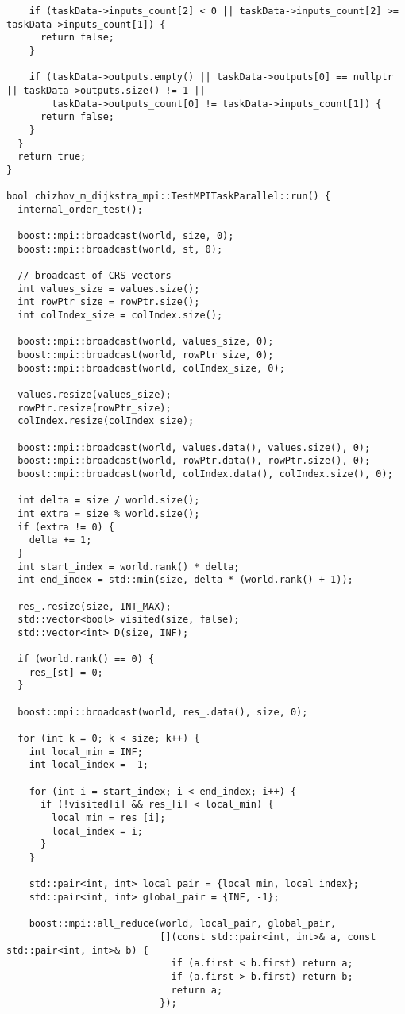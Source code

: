 \documentclass[a4paper, 14pt]{extarticle}
\begin{document}
\begin{lstlisting}
    if (taskData->inputs_count[2] < 0 || taskData->inputs_count[2] >= taskData->inputs_count[1]) {
      return false;
    }

    if (taskData->outputs.empty() || taskData->outputs[0] == nullptr || taskData->outputs.size() != 1 ||
        taskData->outputs_count[0] != taskData->inputs_count[1]) {
      return false;
    }
  }
  return true;
}

bool chizhov_m_dijkstra_mpi::TestMPITaskParallel::run() {
  internal_order_test();

  boost::mpi::broadcast(world, size, 0);
  boost::mpi::broadcast(world, st, 0);

  // broadcast of CRS vectors
  int values_size = values.size();
  int rowPtr_size = rowPtr.size();
  int colIndex_size = colIndex.size();

  boost::mpi::broadcast(world, values_size, 0);
  boost::mpi::broadcast(world, rowPtr_size, 0);
  boost::mpi::broadcast(world, colIndex_size, 0);

  values.resize(values_size);
  rowPtr.resize(rowPtr_size);
  colIndex.resize(colIndex_size);

  boost::mpi::broadcast(world, values.data(), values.size(), 0);
  boost::mpi::broadcast(world, rowPtr.data(), rowPtr.size(), 0);
  boost::mpi::broadcast(world, colIndex.data(), colIndex.size(), 0);

  int delta = size / world.size();
  int extra = size % world.size();
  if (extra != 0) {
    delta += 1;
  }
  int start_index = world.rank() * delta;
  int end_index = std::min(size, delta * (world.rank() + 1));

  res_.resize(size, INT_MAX);
  std::vector<bool> visited(size, false);
  std::vector<int> D(size, INF);

  if (world.rank() == 0) {
    res_[st] = 0;
  }

  boost::mpi::broadcast(world, res_.data(), size, 0);

  for (int k = 0; k < size; k++) {
    int local_min = INF;
    int local_index = -1;

    for (int i = start_index; i < end_index; i++) {
      if (!visited[i] && res_[i] < local_min) {
        local_min = res_[i];
        local_index = i;
      }
    }

    std::pair<int, int> local_pair = {local_min, local_index};
    std::pair<int, int> global_pair = {INF, -1};

    boost::mpi::all_reduce(world, local_pair, global_pair,
                           [](const std::pair<int, int>& a, const std::pair<int, int>& b) {
                             if (a.first < b.first) return a;
                             if (a.first > b.first) return b;
                             return a;
                           });


\end{lstlisting}
\end{document}
